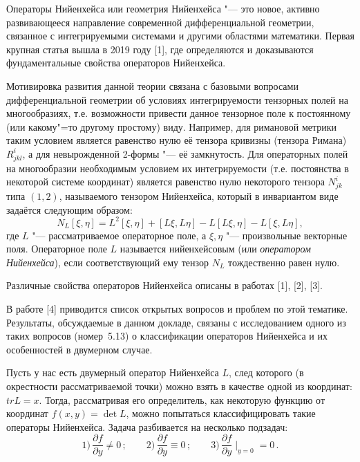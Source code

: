 
\vzmscaption

Операторы Нийенхейса или геометрия Нийенхейса "--- это новое, активно развивающееся направление современной дифференциальной геометрии, связанное с интегрируемыми системами и другими областями математики.
Первая крупная статья вышла в 2019 году [1], где определяются и доказываются фундаментальные свойства операторов Нийенхейса.

Мотивировка развития данной теории связана с базовыми вопросами дифференциальной геометрии об условиях интегрируемости тензорных полей на многообразиях, т.е. возможности привести данное
тензорное поле к постоянному (или какому"=то другому простому) виду. Например, для римановой метрики таким условием является равенство нулю её тензора кривизны (тензора Римана) $R^i_{jkl}$,
а для невырожденной 2-формы "--- её замкнутость. Для операторных полей на многообразии необходимым условием их интегрируемости (т.е. постоянства в некоторой системе координат) является
равенство нулю некоторого тензора $N^i_{jk}$ типа $(1,2)$, называемого тензором Нийенхейса, который в инвариантом виде задаётся следующим образом:
\begin{equation*}
N_L [\xi, \eta] = L^2[\xi, \eta] + [L \xi, L \eta] - L[L \xi, \eta] - L[\xi, L \eta],
\end{equation*}
где $L$ "--- рассматриваемое операторное поле, а $\xi,\eta$ "--- произвольные векторные поля. Операторное поле $L$ называется нийенхейсовым (или \textit{оператором Нийенхейса}), если
соответствующий ему тензор $N_L$ тождественно равен нулю.

Различные свойства операторов Нийенхейса описаны в работах [1], [2], [3].

В работе [4] приводится список открытых вопросов и проблем по этой тематике. Результаты, обсуждаемые в данном докладе, связаны с исследованием одного из таких вопросов (номер~5.13)
о классификации операторов Нийенхейса и их особенностей в двумерном случае.

Пусть у нас есть двумерный оператор Нийенхейса $L$, след которого (в окрестности рассматриваемой точки) можно взять в качестве одной из координат: $tr L = x$.
Тогда, рассматривая его определитель, как некоторую функцию от координат $f(x,y)=\det L$, можно попытаться классифицировать такие операторы Нийенхейса.
Задача разбивается на несколько подзадач:
%
$$
1)\,\frac{\partial f}{\partial y} \neq 0    \,;\qquad
2)\,\frac{\partial f}{\partial y} \equiv 0  \,;\qquad
3)\,\frac{\partial f}{\partial y} \mid_{y = 0} = 0\,.
$$

